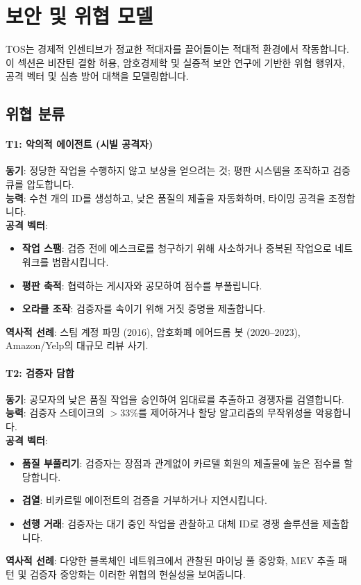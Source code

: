 \documentclass[11pt]{article}
\begin{document}
\section{보안 및 위협 모델}
\label{sec:security}

TOS는 경제적 인센티브가 정교한 적대자를 끌어들이는 적대적 환경에서 작동합니다. 이 섹션은 비잔틴 결함 허용, 암호경제학 및 실증적 보안 연구에 기반한 위협 행위자, 공격 벡터 및 심층 방어 대책을 모델링합니다.

\subsection{위협 분류}

\paragraph{T1: 악의적 에이전트 (시빌 공격자)}
\textbf{동기}: 정당한 작업을 수행하지 않고 보상을 얻으려는 것; 평판 시스템을 조작하고 검증 큐를 압도합니다.\\
\textbf{능력}: 수천 개의 ID를 생성하고, 낮은 품질의 제출을 자동화하며, 타이밍 공격을 조정합니다.\\
\textbf{공격 벡터}:
\begin{itemize}[noitemsep]
  \item \textbf{작업 스팸}: 검증 전에 에스크로를 청구하기 위해 사소하거나 중복된 작업으로 네트워크를 범람시킵니다.
  \item \textbf{평판 축적}: 협력하는 게시자와 공모하여 점수를 부풀립니다.
  \item \textbf{오라클 조작}: 검증자를 속이기 위해 거짓 증명을 제출합니다.
\end{itemize}
\textbf{역사적 선례}: 스팀 계정 파밍 (2016), 암호화폐 에어드롭 봇 (2020--2023), Amazon/Yelp의 대규모 리뷰 사기.

\paragraph{T2: 검증자 담합}
\textbf{동기}: 공모자의 낮은 품질 작업을 승인하여 임대료를 추출하고 경쟁자를 검열합니다.\\
\textbf{능력}: 검증자 스테이크의 $>33\%$를 제어하거나 할당 알고리즘의 무작위성을 악용합니다.\\
\textbf{공격 벡터}:
\begin{itemize}[noitemsep]
  \item \textbf{품질 부풀리기}: 검증자는 장점과 관계없이 카르텔 회원의 제출물에 높은 점수를 할당합니다.
  \item \textbf{검열}: 비카르텔 에이전트의 검증을 거부하거나 지연시킵니다.
  \item \textbf{선행 거래}: 검증자는 대기 중인 작업을 관찰하고 대체 ID로 경쟁 솔루션을 제출합니다.
\end{itemize}
\textbf{역사적 선례}: 다양한 블록체인 네트워크에서 관찰된 마이닝 풀 중앙화, MEV 추출 패턴 및 검증자 중앙화는 이러한 위협의 현실성을 보여줍니다.
\end{document}
